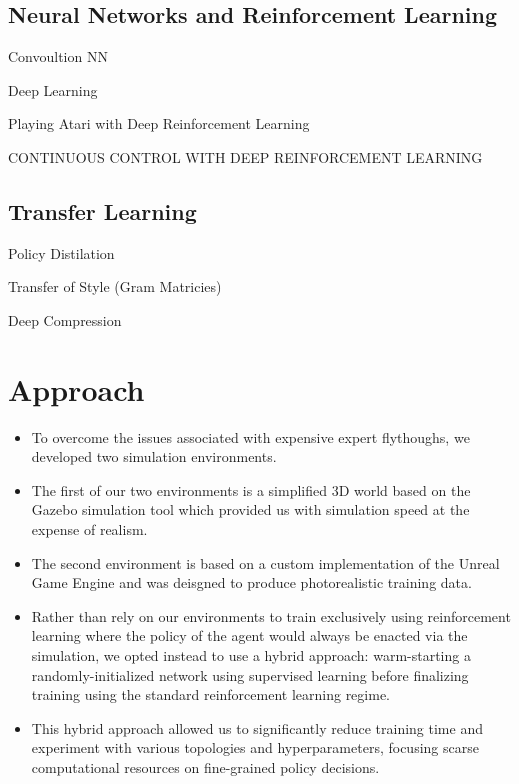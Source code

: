 \documentclass[paper=a4, fontsize=11pt]{scrartcl} %
\begin{document}
	\subsection{Neural Networks and Reinforcement Learning}
		Convoultion NN

		Deep Learning \cite{LeCun2015}

		Playing Atari with Deep Reinforcement Learning~\cite{Mnih2013}

		CONTINUOUS CONTROL WITH DEEP REINFORCEMENT LEARNING~\cite{Lillicrap2015}

	\subsection{Transfer Learning}
		Policy Distilation~\cite{Rusu2015}

		Transfer of Style (Gram Matricies)~\cite{Gatys2015}
		
		Deep Compression~\cite{Han2015}


\section{Approach} 

	\begin{itemize}
		\item To overcome the issues associated with expensive expert flythoughs, we developed two simulation environments. 
		\item The first of our two environments is a simplified 3D world based on	the Gazebo simulation tool which provided us with simulation speed at the expense of realism. 
		\item The second environment is based on a custom implementation of the Unreal Game Engine and was deisgned to produce photorealistic training data.
	\end{itemize}

	\begin{itemize}
		\item Rather than rely on our environments to train exclusively using reinforcement learning where the policy of the agent would always be enacted via the simulation, we opted instead to use a hybrid approach: warm-starting a randomly-initialized network using supervised learning before finalizing training using the standard reinforcement learning regime.
		\item This hybrid approach allowed us to significantly reduce training time and experiment with various topologies and hyperparameters, focusing scarse computational resources on fine-grained policy decisions.
	\end{itemize}
\end{document}
